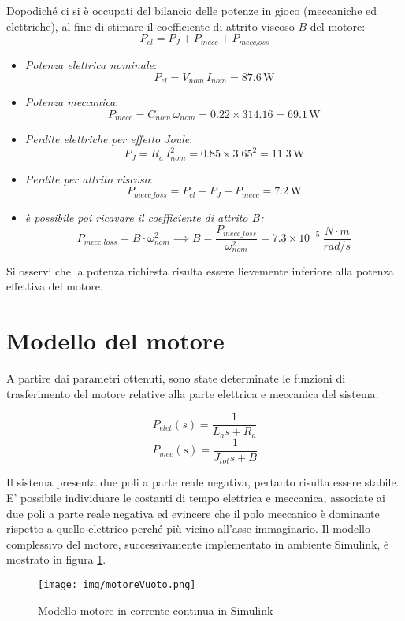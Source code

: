\documentclass{article}
\begin{document}
Dopodiché ci si è occupati del bilancio delle potenze in gioco (meccaniche ed elettriche), al fine di stimare il coefficiente di attrito viscoso $B$ del motore: 
 $$P_{el} = P_{J} + P_{mecc} + P_{mecc_loss}$$ 
\begin{itemize}
\item \textit{Potenza elettrica nominale}: \[P_{el}=V_{nom}\,I_{nom}=87.6\,\mathrm{W}\]
  \item \textit{Potenza meccanica}: 
  \[ P_{mecc}=C_{nom}\,\omega_{nom}=0.22\times314.16=69.1\,\mathrm{W}\]
  \item \textit{Perdite elettriche per effetto Joule}: \[P_{J}=R_a\,I_{nom}^2=0.85\times3.65^2=11.3\,\mathrm{W}\]
  \item \textit{Perdite per attrito viscoso}: \[P_{mecc\_loss}=P_{el}-P_{J}-P_{mecc}=7.2\,\mathrm{W}\]
  \item \textit{è possibile poi ricavare il coefficiente di attrito $B$:}  $$P_{mecc\_loss} = \textit{B}\cdot \omega_{nom}^2 \implies B = \frac{P_{mecc\_loss}}{\omega_{nom}^2} = 7.3\times10^{-5}~ \frac{N\cdot m}{rad/s}$$
\end{itemize}

Si osservi che la potenza richiesta risulta essere lievemente inferiore alla potenza effettiva del motore.

\newpage

\section{Modello del motore}
A partire dai parametri ottenuti, sono state determinate le funzioni di trasferimento del motore relative alla parte elettrica e meccanica del sistema:

$$P_{elet}(s) = \frac{1}{L_as + R_a}$$
$$P_{mec}(s) = \frac{1}{J_{tot}s + B}$$ 

Il sistema presenta due poli a parte reale negativa, pertanto risulta essere stabile. E’ possibile individuare le costanti di tempo elettrica e meccanica, associate ai due poli a parte reale negativa ed evincere che il polo meccanico è dominante rispetto a quello elettrico perché più vicino all'asse immaginario.
Il modello complessivo del motore, successivamente implementato in ambiente Simulink, è mostrato in figura \ref{fig:modello_simulink}.
\begin{figure}[h!]
\centering
    \texttt{[image: img/motoreVuoto.png]} 
    \caption{Modello motore in corrente continua in Simulink}
    \label{fig:modello_simulink}
\end{figure}
\end{document}
